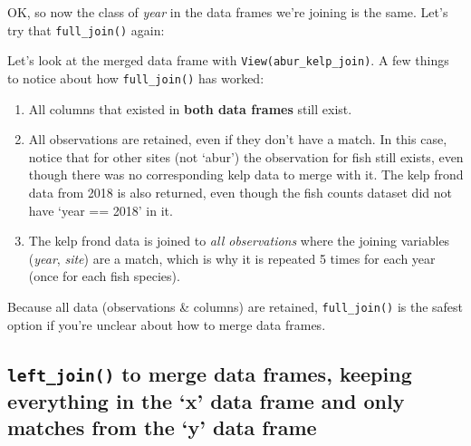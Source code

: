 \documentclass[]{book}
\newenvironment{Shaded}{\begin{snugshade}}{\end{snugshade}}
\newcommand{\DataTypeTok}[1]{\textcolor[rgb]{0.13,0.29,0.53}{#1}}
\newcommand{\DecValTok}[1]{\textcolor[rgb]{0.00,0.00,0.81}{#1}}
\newcommand{\KeywordTok}[1]{\textcolor[rgb]{0.13,0.29,0.53}{\textbf{#1}}}
\newcommand{\NormalTok}[1]{#1}
\newcommand{\OperatorTok}[1]{\textcolor[rgb]{0.81,0.36,0.00}{\textbf{#1}}}
\newcommand{\StringTok}[1]{\textcolor[rgb]{0.31,0.60,0.02}{#1}}
\providecommand{\tightlist}{%
  \setlength{\itemsep}{0pt}\setlength{\parskip}{0pt}}
\begin{document}
OK, so now the class of \emph{year} in the data frames we're joining is the same. Let's try that \texttt{full\_join()} again:

\begin{Shaded}
\end{Shaded}

Let's look at the merged data frame with \texttt{View(abur\_kelp\_join)}. A few things to notice about how \texttt{full\_join()} has worked:

\begin{enumerate}
\def\labelenumi{\arabic{enumi}.}
\tightlist
\item
  All columns that existed in \textbf{both data frames} still exist.
\item
  All observations are retained, even if they don't have a match. In this case, notice that for other sites (not `abur') the observation for fish still exists, even though there was no corresponding kelp data to merge with it. The kelp frond data from 2018 is also returned, even though the fish counts dataset did not have `year == 2018' in it.
\item
  The kelp frond data is joined to \emph{all observations} where the joining variables (\emph{year}, \emph{site}) are a match, which is why it is repeated 5 times for each year (once for each fish species).
\end{enumerate}

Because all data (observations \& columns) are retained, \texttt{full\_join()} is the safest option if you're unclear about how to merge data frames.

\hypertarget{left_join-to-merge-data-frames-keeping-everything-in-the-x-data-frame-and-only-matches-from-the-y-data-frame}{%
\subsection{\texorpdfstring{\texttt{left\_join()} to merge data frames, keeping everything in the `x' data frame and only matches from the `y' data frame}{left\_join() to merge data frames, keeping everything in the `x' data frame and only matches from the `y' data frame}}\label{left_join-to-merge-data-frames-keeping-everything-in-the-x-data-frame-and-only-matches-from-the-y-data-frame}}
\end{document}
